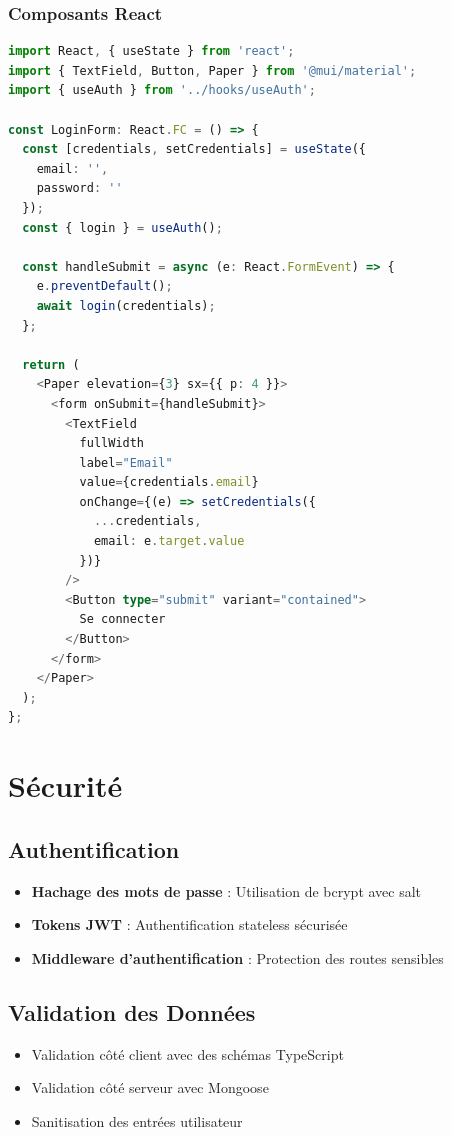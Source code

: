 \documentclass[12pt,a4paper]{article}
\begin{document}
\subsubsection{Composants React}
\begin{lstlisting}[language=typescript, caption=Composant de connexion]
import React, { useState } from 'react';
import { TextField, Button, Paper } from '@mui/material';
import { useAuth } from '../hooks/useAuth';

const LoginForm: React.FC = () => {
  const [credentials, setCredentials] = useState({
    email: '',
    password: ''
  });
  const { login } = useAuth();

  const handleSubmit = async (e: React.FormEvent) => {
    e.preventDefault();
    await login(credentials);
  };

  return (
    <Paper elevation={3} sx={{ p: 4 }}>
      <form onSubmit={handleSubmit}>
        <TextField
          fullWidth
          label="Email"
          value={credentials.email}
          onChange={(e) => setCredentials({
            ...credentials,
            email: e.target.value
          })}
        />
        <Button type="submit" variant="contained">
          Se connecter
        </Button>
      </form>
    </Paper>
  );
};
\end{lstlisting}

\section{Sécurité}

\subsection{Authentification}
\begin{itemize}
    \item \textbf{Hachage des mots de passe} : Utilisation de bcrypt avec salt
    \item \textbf{Tokens JWT} : Authentification stateless sécurisée
    \item \textbf{Middleware d'authentification} : Protection des routes sensibles
\end{itemize}

\subsection{Validation des Données}
\begin{itemize}
    \item Validation côté client avec des schémas TypeScript
    \item Validation côté serveur avec Mongoose
    \item Sanitisation des entrées utilisateur
\end{itemize}
\end{document}
